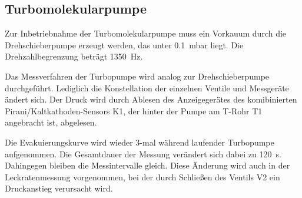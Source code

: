 \subsection{Turbomolekularpumpe}
Zur Inbetriebnahme der Turbomolekularpumpe muss ein Vorkauum durch die Drehschieberpumpe erzeugt werden, das unter \SI{0.1}{\milli\bar} liegt. Die Drehzahlbegrenzung beträgt \SI{1350}{\hertz}.

Das Messverfahren der Turbopumpe wird analog zur Drehschieberpumpe durchgeführt. Lediglich die Konstellation der einzelnen Ventile und Messgeräte ändert sich.
Der Druck wird durch Ablesen des Anzeigegerätes des komibinierten Pirani/Kaltkathoden-Sensors K1, der hinter der Pumpe am T-Rohr T1 angebracht ist, abgelesen.

Die Evakuierungskurve wird wieder 3-mal während laufender Turbopumpe aufgenommen. Die Gesamtdauer der Messung verändert sich dabei zu \SI{120}{\second}. Dahingegen bleiben die Messintervalle gleich.
Diese Änderung wird auch in der Leckratenmessung vorgenommen, bei der durch Schließen des Ventils V2 ein Druckanstieg verursacht wird.